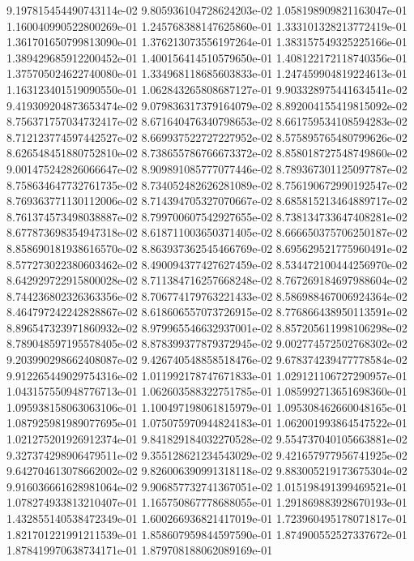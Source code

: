 9.197815454490743114e-02
9.805936104728624203e-02
1.058198909821163047e-01
1.160040990522800269e-01
1.245768388147625860e-01
1.333101328213772419e-01
1.361701650799813090e-01
1.376213073556197264e-01
1.383157549325225166e-01
1.389429685912200452e-01
1.400156414510579650e-01
1.408122172118740356e-01
1.375705024622740080e-01
1.334968118685603833e-01
1.247459904819224613e-01
1.163123401519090550e-01
1.062843265808687127e-01
9.903328975441634541e-02
9.419309204873653474e-02
9.079836317379164079e-02
8.892004155419815092e-02
8.756371757034732417e-02
8.671640476340798653e-02
8.661759534108594283e-02
8.712123774597442527e-02
8.669937522727227952e-02
8.575895765480799626e-02
8.626548451880752810e-02
8.738655786766673372e-02
8.858018727548749860e-02
9.001475242826066647e-02
8.909891085777077446e-02
8.789367301125097787e-02
8.758634647732761735e-02
8.734052482626281089e-02
8.756190672990192547e-02
8.769363771130112006e-02
8.714394705327070667e-02
8.685815213464889717e-02
8.761374573498038887e-02
8.799700607542927655e-02
8.738134733647408281e-02
8.677873698354947318e-02
8.618711003650371405e-02
8.666650375706250187e-02
8.858690181938616570e-02
8.863937362545466769e-02
8.695629521775960491e-02
8.577273022380603462e-02
8.490094377427627459e-02
8.534472100444256970e-02
8.642929722915800028e-02
8.711384716257668248e-02
8.767269184697988604e-02
8.744236802326363356e-02
8.706774179763221433e-02
8.586988467006924364e-02
8.464797242242828867e-02
8.618606557073726915e-02
8.776866438950113591e-02
8.896547323971860932e-02
8.979965546632937001e-02
8.857205611998106298e-02
8.789048597195578405e-02
8.878399377879372945e-02
9.002774572502768302e-02
9.203990298662408087e-02
9.426740548858518476e-02
9.678374239477778584e-02
9.912265449029754316e-02
1.011992178747671833e-01
1.029121106727290957e-01
1.043157550948776713e-01
1.062603588322751785e-01
1.085992713651698360e-01
1.095938158063063106e-01
1.100497198061815979e-01
1.095308462660048165e-01
1.087925981989077695e-01
1.075075970944824183e-01
1.062001993864547522e-01
1.021275201926912374e-01
9.841829184032270528e-02
9.554737040105663881e-02
9.327374298906479511e-02
9.355128621234543029e-02
9.421657977956741925e-02
9.642704613078662002e-02
9.826006390991318118e-02
9.883005219173675304e-02
9.916036661628981064e-02
9.906857732741367051e-02
1.015198491399469521e-01
1.078274933813210407e-01
1.165750867778688055e-01
1.291869883928670193e-01
1.432855140538472349e-01
1.600266936821417019e-01
1.723960495178071817e-01
1.821701221991211539e-01
1.858607959844597590e-01
1.874900552527337672e-01
1.878419970638734171e-01
1.879708188062089169e-01
